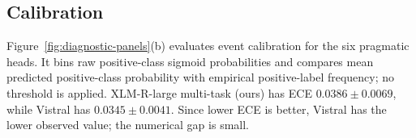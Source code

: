 \subsection{Calibration}
Figure~\ref{fig:diagnostic-panels}(b) evaluates event calibration for the six pragmatic heads. It bins raw positive-class sigmoid probabilities and compares mean predicted positive-class probability with empirical positive-label frequency; no threshold is applied. XLM-R-large multi-task (ours) has ECE $0.0386 \pm 0.0069$, while Vistral has $0.0345 \pm 0.0041$. Since lower ECE is better, Vistral has the lower observed value; the numerical gap is small.
